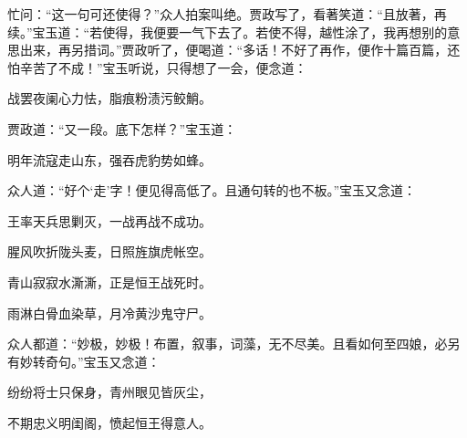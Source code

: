 \begin{parag}
    忙问：“这一句可还使得？”众人拍案叫绝。贾政写了，看著笑道：“且放著，再续。”宝玉道：“若使得，我便要一气下去了。若使不得，越性涂了，我再想别的意思出来，再另措词。”贾政听了，便喝道：“多话！不好了再作，便作十篇百篇，还怕辛苦了不成！”宝玉听说，只得想了一会，便念道：
\end{parag}


\begin{poem}
    \begin{pl}战罢夜阑心力怯，脂痕粉渍污鲛鮹。\end{pl}
\end{poem}


\begin{parag}
    贾政道：“又一段。底下怎样？”宝玉道：
\end{parag}


\begin{poem}
    \begin{pl}明年流寇走山东，强吞虎豹势如蜂。\end{pl}
\end{poem}


\begin{parag}
    众人道：“好个‘走’字！便见得高低了。且通句转的也不板。”宝玉又念道：
\end{parag}


\begin{poem}
    \begin{pl}王率天兵思剿灭，一战再战不成功。\end{pl}

    \begin{pl}腥风吹折陇头麦，日照旌旗虎帐空。\end{pl}

    \begin{pl}青山寂寂水澌澌，正是恒王战死时。\end{pl}

    \begin{pl}雨淋白骨血染草，月冷黄沙鬼守尸。\end{pl}

\end{poem}


\begin{parag}
    众人都道：“妙极，妙极！布置，叙事，词藻，无不尽美。且看如何至四娘，必另有妙转奇句。”宝玉又念道：
\end{parag}


\begin{poem}
    \begin{pl}纷纷将士只保身，青州眼见皆灰尘，\end{pl}

    \begin{pl}不期忠义明闺阁，愤起恒王得意人。\end{pl}

\end{poem}


